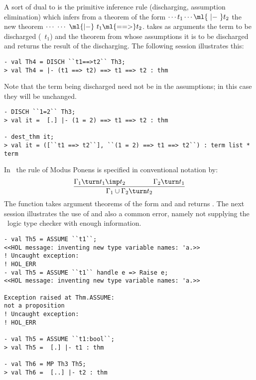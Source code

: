 A sort of dual to  is the primitive inference rule
 (discharging, assumption elimination) which infers from
a theorem of the form $\cdots t_1\cdots\ml{\ |-\ }t_2$ the new theorem
$\cdots\ \cdots\ \ml{|-}\ t_1\ml{==>}t_2$.  takes as arguments
the term to be discharged (\ie\ $t_1$) and the theorem from whose
assumptions it is to be discharged and returns the result of the discharging.
The following session illustrates this:

\begin{session}
\begin{verbatim}
- val Th4 = DISCH ``t1==>t2`` Th3;
> val Th4 = |- (t1 ==> t2) ==> t1 ==> t2 : thm
\end{verbatim}
\end{session}
Note that the term being discharged need not be in the assumptions; in
this case they will be unchanged.

\begin{session}
\begin{verbatim}
- DISCH ``1=2`` Th3;
> val it =  [.] |- (1 = 2) ==> t1 ==> t2 : thm

- dest_thm it;
> val it = ([``t1 ==> t2``], ``(1 = 2) ==> t1 ==> t2``) : term list * term
\end{verbatim}
\end{session}

In \HOL\, the rule  of Modus Ponens is specified in conventional notation by:
\[
\frac{\Gamma_1 \turn t_1 \imp t_2 \qquad\qquad \Gamma_2\turn t_1}
{\Gamma_1 \cup \Gamma_2 \turn t_2}
\]
The \ML{} function  takes argument theorems of the form
 and  and
returns . The next session illustrates the use
of  and also a common error, namely not supplying the \HOL\
logic type checker with enough information.

\begin{session}
\begin{verbatim}
- val Th5 = ASSUME ``t1``;
<<HOL message: inventing new type variable names: 'a.>>
! Uncaught exception:
! HOL_ERR
- val Th5 = ASSUME ``t1`` handle e => Raise e;
<<HOL message: inventing new type variable names: 'a.>>

Exception raised at Thm.ASSUME:
not a proposition
! Uncaught exception:
! HOL_ERR

- val Th5 = ASSUME ``t1:bool``;
> val Th5 =  [.] |- t1 : thm

- val Th6 = MP Th3 Th5;
> val Th6 =  [..] |- t2 : thm
\end{verbatim}
\end{session}

